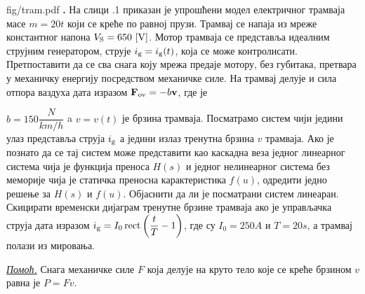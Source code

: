 \newpage
\begin{slikaDesno}[0.83]{fig/tram.pdf}
    \textbf{\ID.} 
На слици \ID.1 приказан је упрошћени модел 
електричног трамваја масе $m = 20\unit{t}$ који
се креће по равној прузи. Трамвај 
се напаја из мреже константног напона $V_{\rm S} = 
650\,\left[\mathrm{V}\right]$. Мотор трамваја се представља 
идеалним струјним генератором, струје 
$i_{\rm g} = i_{\rm g}(t)$, која се 
може контролисати. Претпоставити да се сва снага
коју мрежа предаје мотору, без губитака, претвара у механичку 
енергију посредством механичке силе. 
На трамвај делује и сила отпора ваздуха
дата изразом ${\bf F}_{\rm ov} = -b {\bf v}$, где је\linebreak 
\vspace*{-3mm}
\end{slikaDesno} 
$b = 150\unit{\dfrac{N}{km/h}}$ a 
$v = v(t)$ је брзина трамваја.
Посматрамо систем чији једини
улаз представља струја $i_{\rm g}$ а једини
излаз тренутна брзина $v$ трамваја. 
Ако је познато да се тај систем може представити 
као каскадна веза једног линеарног система 
чија је функција преноса $H(s)$ и једног 
нелинеарног система без меморије чија је 
статичка преносна карактеристика $f(u)$,
одредити једно решење за 
$H(s)$ и $f(u)$. Објаснити да ли 
је посматрани систем линеаран.
Скицирати временски дијаграм тренутне брзине 
трамваја ако је управљачка струја дата изразом
$i_{\rm g} = I_0 \operatorname{rect}
\left( \dfrac{t}{T} - 1 \right)$,
где су $I_0 = 250\unit{A}$ и $T = 20\unit{s}$,
а трамвај полази из мировања.
\vspace*{1mm}

\noindent
\textit{\underline{Помоћ.}} Снага механичке силе $F$ која 
делује на круто тело које се креће брзином $v$ 
равна је $P = Fv$. \\

